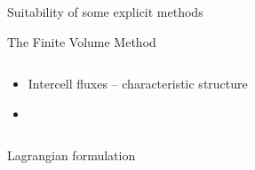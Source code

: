 \begin{withoutheadline}
\begin{frame}{Suitability of some explicit methods}
\begin{block}{The Finite Volume Method \cite{Leveque}}
\begin{overprint}
\begin{columns}
\begin{footnotesize}
\begin{column}{0.6\textwidth}
              \begin{itemize}
              \item[] Intercell fluxes -- characteristic structure \cite{Godunov_method}
              \item[] %
              \end{itemize}
            \end{column}
          \end{footnotesize}
        \end{columns}
        \vskip -10pt
        \begin{columns}
          \begin{column}{0.48\textwidth}
            \begin{block}{\footnotesize Lagrangian formulation \cite{Haider_FVM}} %
              \centering

            \end{block}
          \end{column}
          \begin{column}{0.48\textwidth}
            
          \end{column}
        \end{columns}
        \vspace{-0.2cm}
      \end{overprint}
    \end{block}
  \end{frame}
\end{withoutheadline}



